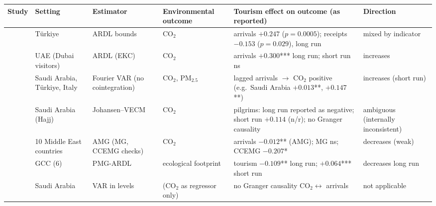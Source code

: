 \begin{tabular}{@{}p{3.1cm}p{2.3cm}p{2.9cm}p{2.9cm}p{4.0cm}p{2.4cm}@{}}
\toprule
Study & Setting & Estimator & Environmental outcome & Tourism effect on outcome (as reported) & Direction\\
\midrule
\citet{Bahar2023} & T\"urkiye & ARDL bounds & CO$_2$ & arrivals $+0.247$ ($p=0.0005$); receipts $-0.153$ ($p=0.029$), long run & mixed by indicator\\
\citet{Majumdar2022} & UAE (Dubai visitors) & ARDL (EKC) & CO$_2$ & arrivals $+0.300$*** long run; short run ns & increases\\
\citet{Bildirici2025} & Saudi Arabia, T\"urkiye, Italy & Fourier VAR (no cointegration) & CO$_2$, PM$_{2.5}$ & lagged arrivals $\rightarrow$ CO$_2$ positive (e.g.\ Saudi Arabia $+0.013$**, $+0.147$**) & increases (short run)\\
\citet{Naseem2025} & Saudi Arabia (Hajj) & Johansen--VECM & CO$_2$ & pilgrims: long run reported as negative; short run $+0.114$ (n/r); no Granger causality & ambiguous (internally inconsistent)\\
\citet{Voumik2023} & 10 Middle East countries & AMG (MG, CCEMG checks) & CO$_2$ & arrivals $-0.012$** (AMG); MG ns; CCEMG $-0.207$* & decreases (weak)\\
\citet{Zmami2024} & GCC (6) & PMG-ARDL & ecological footprint & tourism $-0.109$** long run; $+0.064$*** short run & decreases long run\\
\citet{Jamel2020} & Saudi Arabia & VAR in levels & (CO$_2$ as regressor only) & no Granger causality CO$_2\leftrightarrow$ arrivals & not applicable\\
\bottomrule
\end{tabular}
